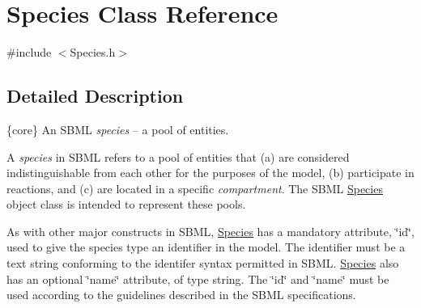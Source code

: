 \hypertarget{class_species}{}\section{Species Class Reference}
\label{class_species}


{\ttfamily \#include $<$Species.\+h$>$}



\subsection{Detailed Description}
\{core\} An S\+B\+ML {\itshape species} -- a pool of entities.

A {\itshape species} in S\+B\+ML refers to a pool of entities that (a) are considered indistinguishable from each other for the purposes of the model, (b) participate in reactions, and (c) are located in a specific {\itshape compartment}. The S\+B\+ML \hyperlink{class_species}{Species} object class is intended to represent these pools.

As with other major constructs in S\+B\+ML, \hyperlink{class_species}{Species} has a mandatory attribute, \char`\"{}id\char`\"{}, used to give the species type an identifier in the model. The identifier must be a text string conforming to the identifer syntax permitted in S\+B\+ML. \hyperlink{class_species}{Species} also has an optional \char`\"{}name\char`\"{} attribute, of type {\ttfamily string}. The \char`\"{}id\char`\"{} and \char`\"{}name\char`\"{} must be used according to the guidelines described in the S\+B\+ML specifications.

